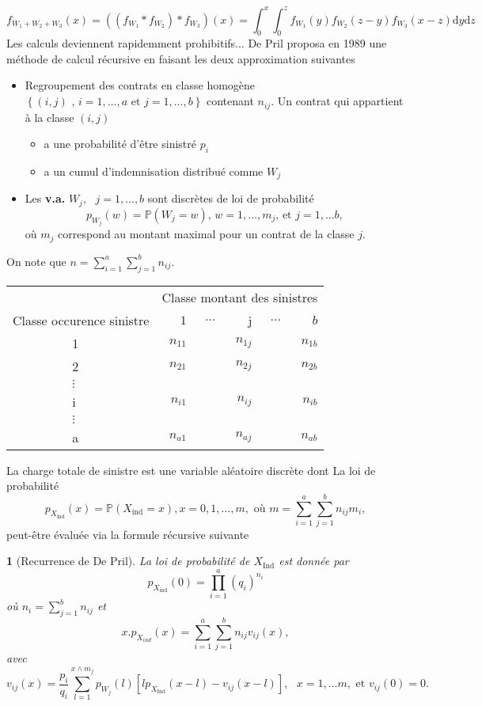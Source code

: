 \documentclass[8pt,notheorems]{beamer}
\newcommand{\ra}[1]{\renewcommand{\arraystretch}{#1}}
\def \P {\mathbb P}
\newtheorem{theorem}{\translate{Theorem}}[section]
\newtheorem{theorem}{\translate{Theorem}}
\theoremstyle{definition}
\theoremstyle{example}
\theoremstyle{mystyle}
\theoremstyle{plain}
\begin{document}
\begin{frame}[allowframebreaks]
$$
f_{W_1+W_2+W_3}(x) = ((f_{W_1}\ast f_{W_2})\ast f_{W_3})(x) = \int_0^x\int_{0}^{z}f_{W_1}(y)f_{W_2}(z-y) f_{W_3}(x-z)\text{d}y\text{d}z
$$
Les calculs deviennent rapidemment prohibitifs... De Pril \cite{depril_1989} proposa en 1989 une méthode de calcul récursive en faisant les deux approximation suivantes 
\begin{itemize}
    \item Regroupement des contrats en classe homogène $\left\{(i,j)\text{ , }i = 1,\ldots, a\text{ et }j = 1,\ldots,b\right\}$ contenant $n_{ij}$. Un contrat qui appartient à la classe $(i,j)$ 
    \begin{itemize}
        \item a une probabilité d'être sinistré $p_i$ 
        \item a un cumul d'indemnisation distribué comme $W_j$
    \end{itemize}
    \item Les \textbf{v.a.} $W_j,\text{ }j = 1,\ldots, b$ sont discrètes de loi de probabilité 
    $$
    p_{W_j}(w) = \P(W_j = w)\text{, }w = 1,\ldots, m_j\text{, et }j = 1,\ldots b,
    $$
    où $m_j$ correspond au montant maximal pour un contrat de la classe $j.$
\end{itemize}
On note que $n = \sum_{i = 1}^{a}\sum_{j = 1}^{b}n_{ij}$. 
\begin{table}[h!]\centering
\ra{1.3}
\scriptsize
\begin{tabular}{@{}ll|rrrrr@{}}\toprule
&&\multicolumn{5}{c}{Classe montant des sinistres}\\
\cmidrule{3-7}
 \multicolumn{2}{c|}{Classe occurence sinistre}&$1$&$\ldots$&j&$\ldots$&$b$\\
\midrule
 & 1&$n_{11}$ &  & $n_{1j}$ & &$n_{1b}$  \\
& 2&$n_{21}$ &  & $n_{2j}$ & &$n_{2b}$  \\
&$\vdots$& &  &  & &  \\
& i&$n_{i1}$ &  & $n_{ij}$ & &$n_{ib}$  \\
 &$\vdots$ & &  &  & &  \\
 &a&$n_{a1}$ &  & $n_{aj}$ & &$n_{ab}$  \\
\bottomrule
\end{tabular}
\end{table}
La charge totale de sinistre est une variable aléatoire discrète dont La loi de probabilité 
$$
p_{X_{\text{ind}}}(x) = \P(X_{\text{ind}} = x), x = 0,1,\ldots, m, \text{ où }m = \sum_{i = 1}^a\sum_{j = 1}^b n_{ij}m_i,
$$
peut-être évaluée via la formule récursive suivante
\begin{theorem}[Recurrence de De Pril]
La loi de probabilité de $X_{\text{Ind}}$ est donnée par
$$
p_{X_{\text{ind}}}(0) = \prod_{i = 1}^a (q_i)^{n_i}
$$
où $n_i = \sum_{j = 1}^b n_{ij}$ et 
$$
x.p_{X_{ind}}(x) = \sum_{i = 1}^{a}\sum_{j = 1}^{b}n_{ij}v_{ij}(x),
$$
avec 
$$
v_{ij}(x) = \frac{p_i}{q_i}\sum_{l = 1}^{x\land m_j}p_{W_{j}}(l)\left[lp_{X_{\text{Ind}}}(x-l)-v_{ij}(x-l)\right],\text{ }x = 1,\ldots m,\text{ et }v_{ij}(0) = 0.
$$


\end{theorem}
\end{frame}
\end{document}
